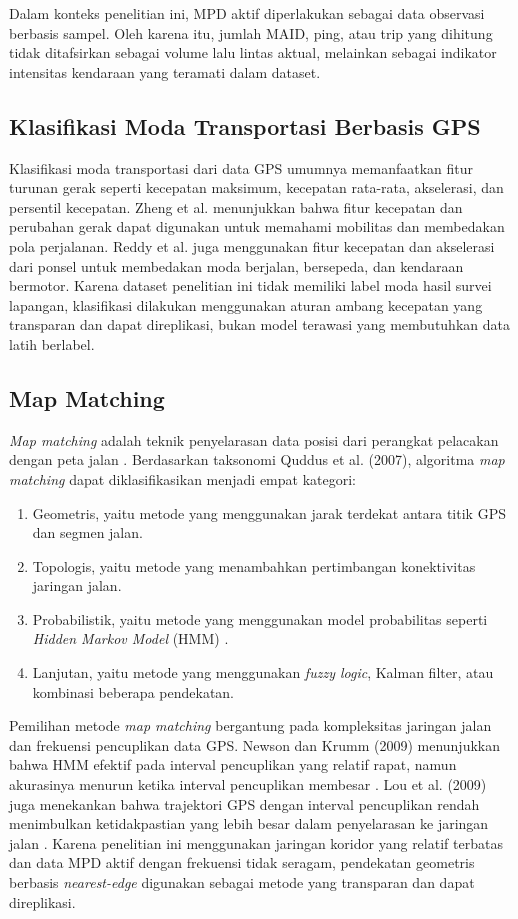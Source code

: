 Dalam konteks penelitian ini, MPD aktif diperlakukan sebagai data observasi berbasis sampel. Oleh karena itu, jumlah MAID, ping, atau trip yang dihitung tidak ditafsirkan sebagai volume lalu lintas aktual, melainkan sebagai indikator intensitas kendaraan yang teramati dalam dataset.

\subsection{Klasifikasi Moda Transportasi Berbasis GPS}

Klasifikasi moda transportasi dari data GPS umumnya memanfaatkan fitur turunan gerak seperti kecepatan maksimum, kecepatan rata-rata, akselerasi, dan persentil kecepatan. Zheng et al. \cite{zheng2008} menunjukkan bahwa fitur kecepatan dan perubahan gerak dapat digunakan untuk memahami mobilitas dan membedakan pola perjalanan. Reddy et al. \cite{reddy2010} juga menggunakan fitur kecepatan dan akselerasi dari ponsel untuk membedakan moda berjalan, bersepeda, dan kendaraan bermotor. Karena dataset penelitian ini tidak memiliki label moda hasil survei lapangan, klasifikasi dilakukan menggunakan aturan ambang kecepatan yang transparan dan dapat direplikasi, bukan model terawasi yang membutuhkan data latih berlabel.

\subsection{Map Matching}

\textit{Map matching} adalah teknik penyelarasan data posisi dari perangkat pelacakan dengan peta jalan \cite{quddus2007}. Berdasarkan taksonomi Quddus et al. (2007), algoritma \textit{map matching} dapat diklasifikasikan menjadi empat kategori:
\begin{enumerate}
    \item Geometris, yaitu metode yang menggunakan jarak terdekat antara titik GPS dan segmen jalan.
    \item Topologis, yaitu metode yang menambahkan pertimbangan konektivitas jaringan jalan.
    \item Probabilistik, yaitu metode yang menggunakan model probabilitas seperti \textit{Hidden Markov Model} (HMM) \cite{newson2009}.
    \item Lanjutan, yaitu metode yang menggunakan \textit{fuzzy logic}, Kalman filter, atau kombinasi beberapa pendekatan.
\end{enumerate}

Pemilihan metode \textit{map matching} bergantung pada kompleksitas jaringan jalan dan frekuensi pencuplikan data GPS. Newson dan Krumm (2009) menunjukkan bahwa HMM efektif pada interval pencuplikan yang relatif rapat, namun akurasinya menurun ketika interval pencuplikan membesar \cite{newson2009}. Lou et al. (2009) juga menekankan bahwa trajektori GPS dengan interval pencuplikan rendah menimbulkan ketidakpastian yang lebih besar dalam penyelarasan ke jaringan jalan \cite{lou2009}. Karena penelitian ini menggunakan jaringan koridor yang relatif terbatas dan data MPD aktif dengan frekuensi tidak seragam, pendekatan geometris berbasis \textit{nearest-edge} digunakan sebagai metode yang transparan dan dapat direplikasi.

